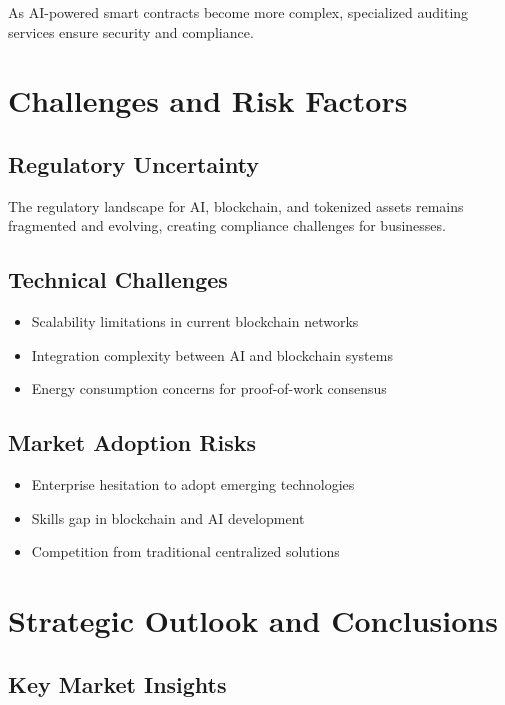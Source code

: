 \documentclass[11pt,a4paper]{report}
\begin{document}
As AI-powered smart contracts become more complex, specialized auditing services ensure security and compliance.

\chapter{Challenges and Risk Factors}

\section{Regulatory Uncertainty}

The regulatory landscape for AI, blockchain, and tokenized assets remains fragmented and evolving, creating compliance challenges for businesses.

\section{Technical Challenges}

\begin{itemize}
\item Scalability limitations in current blockchain networks
\item Integration complexity between AI and blockchain systems
\item Energy consumption concerns for proof-of-work consensus
\end{itemize}

\section{Market Adoption Risks}

\begin{itemize}
\item Enterprise hesitation to adopt emerging technologies
\item Skills gap in blockchain and AI development
\item Competition from traditional centralized solutions
\end{itemize}

\chapter{Strategic Outlook and Conclusions}

\section{Key Market Insights}
\end{document}

